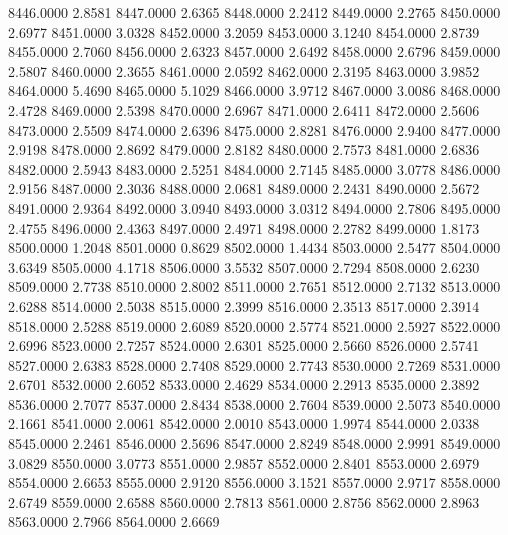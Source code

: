 8446.0000      2.8581
8447.0000      2.6365
8448.0000      2.2412
8449.0000      2.2765
8450.0000      2.6977
8451.0000      3.0328
8452.0000      3.2059
8453.0000      3.1240
8454.0000      2.8739
8455.0000      2.7060
8456.0000      2.6323
8457.0000      2.6492
8458.0000      2.6796
8459.0000      2.5807
8460.0000      2.3655
8461.0000      2.0592
8462.0000      2.3195
8463.0000      3.9852
8464.0000      5.4690
8465.0000      5.1029
8466.0000      3.9712
8467.0000      3.0086
8468.0000      2.4728
8469.0000      2.5398
8470.0000      2.6967
8471.0000      2.6411
8472.0000      2.5606
8473.0000      2.5509
8474.0000      2.6396
8475.0000      2.8281
8476.0000      2.9400
8477.0000      2.9198
8478.0000      2.8692
8479.0000      2.8182
8480.0000      2.7573
8481.0000      2.6836
8482.0000      2.5943
8483.0000      2.5251
8484.0000      2.7145
8485.0000      3.0778
8486.0000      2.9156
8487.0000      2.3036
8488.0000      2.0681
8489.0000      2.2431
8490.0000      2.5672
8491.0000      2.9364
8492.0000      3.0940
8493.0000      3.0312
8494.0000      2.7806
8495.0000      2.4755
8496.0000      2.4363
8497.0000      2.4971
8498.0000      2.2782
8499.0000      1.8173
8500.0000      1.2048
8501.0000      0.8629
8502.0000      1.4434
8503.0000      2.5477
8504.0000      3.6349
8505.0000      4.1718
8506.0000      3.5532
8507.0000      2.7294
8508.0000      2.6230
8509.0000      2.7738
8510.0000      2.8002
8511.0000      2.7651
8512.0000      2.7132
8513.0000      2.6288
8514.0000      2.5038
8515.0000      2.3999
8516.0000      2.3513
8517.0000      2.3914
8518.0000      2.5288
8519.0000      2.6089
8520.0000      2.5774
8521.0000      2.5927
8522.0000      2.6996
8523.0000      2.7257
8524.0000      2.6301
8525.0000      2.5660
8526.0000      2.5741
8527.0000      2.6383
8528.0000      2.7408
8529.0000      2.7743
8530.0000      2.7269
8531.0000      2.6701
8532.0000      2.6052
8533.0000      2.4629
8534.0000      2.2913
8535.0000      2.3892
8536.0000      2.7077
8537.0000      2.8434
8538.0000      2.7604
8539.0000      2.5073
8540.0000      2.1661
8541.0000      2.0061
8542.0000      2.0010
8543.0000      1.9974
8544.0000      2.0338
8545.0000      2.2461
8546.0000      2.5696
8547.0000      2.8249
8548.0000      2.9991
8549.0000      3.0829
8550.0000      3.0773
8551.0000      2.9857
8552.0000      2.8401
8553.0000      2.6979
8554.0000      2.6653
8555.0000      2.9120
8556.0000      3.1521
8557.0000      2.9717
8558.0000      2.6749
8559.0000      2.6588
8560.0000      2.7813
8561.0000      2.8756
8562.0000      2.8963
8563.0000      2.7966
8564.0000      2.6669
